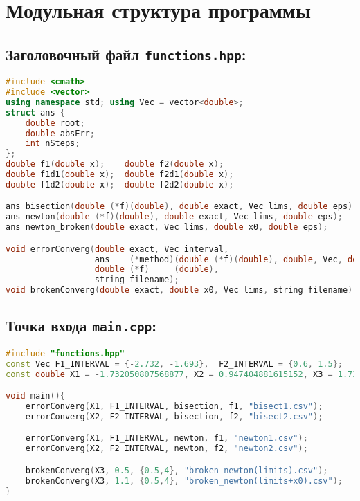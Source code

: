 \section{Модульная структура программы}
\subsection{Заголовочный файл \texttt{functions.hpp}:}
\begin{lstlisting}[language=c++]
#include <cmath>
#include <vector>
using namespace std; using Vec = vector<double>;
struct ans {
    double root;
    double absErr;
    int nSteps;
};
double f1(double x);    double f2(double x);
double f1d1(double x);  double f2d1(double x);
double f1d2(double x);  double f2d2(double x);

ans bisection(double (*f)(double), double exact, Vec lims, double eps);
ans newton(double (*f)(double), double exact, Vec lims, double eps);
ans newton_broken(double exact, Vec lims, double x0, double eps);

void errorConverg(double exact, Vec interval,
                  ans    (*method)(double (*f)(double), double, Vec, double),
                  double (*f)     (double),
                  string filename);
void brokenConverg(double exact, double x0, Vec lims, string filename);
\end{lstlisting}
\subsection{Точка входа \texttt{main.cpp}:}
\begin{lstlisting}[language=c++]
#include "functions.hpp"
const Vec F1_INTERVAL = {-2.732, -1.693},  F2_INTERVAL = {0.6, 1.5};
const double X1 = -1.732050807568877, X2 = 0.947404881615152, X3 = 1.732050807568877;

void main(){
    errorConverg(X1, F1_INTERVAL, bisection, f1, "bisect1.csv");
    errorConverg(X2, F2_INTERVAL, bisection, f2, "bisect2.csv");

    errorConverg(X1, F1_INTERVAL, newton, f1, "newton1.csv");
    errorConverg(X2, F2_INTERVAL, newton, f2, "newton2.csv");

    brokenConverg(X3, 0.5, {0.5,4}, "broken_newton(limits).csv");
    brokenConverg(X3, 1.1, {0.5,4}, "broken_newton(limits+x0).csv");
}
\end{lstlisting}
